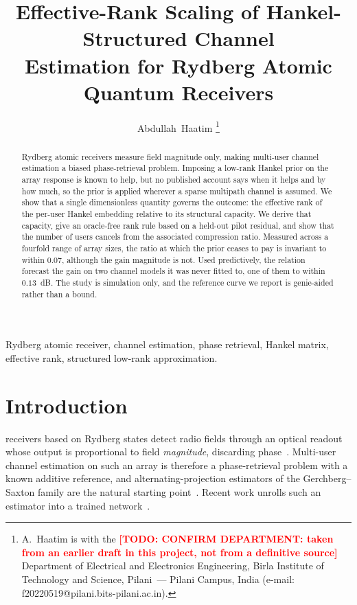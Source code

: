 \documentclass[journal]{IEEEtran}
\newcommand{\todo}[1]{\textcolor{red}{\textbf{[TODO: #1]}}}
\begin{document}
\title{Effective-Rank Scaling of Hankel-Structured Channel\\
Estimation for Rydberg Atomic Quantum Receivers}

\author{Abdullah~Haatim%
\thanks{A.~Haatim is with the \todo{CONFIRM DEPARTMENT: taken from an earlier
draft in this project, not from a definitive source} Department of Electrical
and Electronics Engineering, Birla Institute of Technology and Science,
Pilani~--- Pilani Campus, India (e-mail:
f20220519@pilani.bits-pilani.ac.in).}}

\maketitle

\begin{abstract}
Rydberg atomic receivers measure field magnitude only, making multi-user
channel estimation a biased phase-retrieval problem. Imposing a low-rank
Hankel prior on the array response is known to help, but no published account
says when it helps and by how much, so the prior is applied wherever a sparse
multipath channel is assumed. We show that a single dimensionless quantity
governs the outcome: the effective rank of the per-user Hankel embedding
relative to its structural capacity. We derive that capacity, give an
oracle-free rank rule based on a held-out pilot residual, and show that the
number of users cancels from the associated compression ratio. Measured across
a fourfold range of array sizes, the ratio at which the prior ceases to pay is
invariant to within $0.07$, although the gain magnitude is not. Used
predictively, the relation forecast the gain on two channel models it was
never fitted to, one of them to within $0.13$~dB. The study is simulation
only, and the reference curve we report is genie-aided rather than a bound.
\end{abstract}

\begin{IEEEkeywords}
Rydberg atomic receiver, channel estimation, phase retrieval, Hankel matrix,
effective rank, structured low-rank approximation.
\end{IEEEkeywords}

\section{Introduction}

 receivers based on Rydberg states detect radio fields
through an optical readout whose output is proportional to field
\emph{magnitude}, discarding phase~\cite{cui2025,gong2025mag}. Multi-user
channel estimation on such an array is therefore a phase-retrieval problem
with a known additive reference, and alternating-projection estimators of the
Gerchberg--Saxton family are the natural starting
point~\cite{gerchberg1972,netrapalli2015}. Recent work unrolls such an
estimator into a trained network~\cite{xiao2026}.
\end{document}
